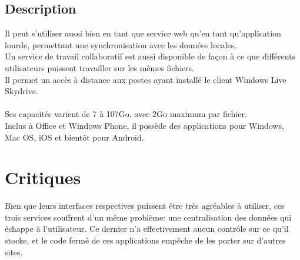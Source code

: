 \subsection{Description}
Il peut s'utiliser aussi bien en tant que service web qu'en tant qu'application lourde, permettant une synchronisation avec les données locales.\\
Un service de travail collaboratif est aussi disponible de façon à ce que différents utilisateurs puissent travailler sur les mêmes fichiers.\\
Il permet un accès à distance aux postes ayant installé le client Windows Live Skydrive.\\
\\
Ses capacités varient de 7 à 107Go, avec 2Go maximum par fichier.\\
Inclus à Office et Windows Phone, il possède des applications pour Windows, Mac OS, iOS et bientôt pour Android.\\


\section{Critiques}
Bien que leurs interfaces respectives puissent être très agréables à utiliser, ces trois services souffrent d'un même problème: une centralisation des données qui échappe à l'utilisateur. Ce dernier n'a effectivement aucun contrôle sur ce qu'il stocke, et le code fermé de ces applications empêche de les porter sur d'autres sites.